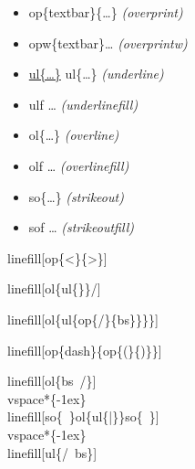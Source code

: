 \documentclass[english,12pt,openany,letterpaper]{book}
\begin{document}
\begin{itemize}
	\item {} \tab \bs op\{\bs textbar\}\{\ldots\} \tab \textit{(\bs overprint)}
	\item \opw{\textbar}\bs opw\{\bs textbar\}\ldots {} \textit{(\bs overprintw)}
	\item \ul{\bs ul\{\ldots\}} \tab\bs ul\{\ldots\} \tab \textit{(\bs underline)}
	\item \ulf \bs ulf \ldots {} \textit{(\bs underlinefill)}
	\item {} \tab\bs ol\{\ldots\} \tab \textit{(\bs overline)}
	\item \olf \bs olf \ldots {} \textit{(\bs overlinefill)}
	\item {} \tab\bs so\{\ldots\} \tab \textit{(\bs strikeout)}
	\item \sof \bs sof \ldots {} \textit{(\bs strikeoutfill)}
\end{itemize}

\skipline

\bs linefill[\bs op\{<\}\{>\}]

\linefill[\op{<}{>}]

\skipline

\bs linefill[\bs ol\{\bs ul\{\tld\}\}/]

\linefill[\ol{\ul{~}}/]

\skipline

\bs linefill[\bs ol\{\bs ul\{\bs op\{/\}\{\bs bs\}\}\}\}]

\linefill[{\ol{\ul{\op{/}{\bs}}}}]

\skipline

\bs linefill[\bs op\{\bs dash\}\{\bs op\{(\}\{)\}\}]

\linefill[\op{\dash}{\op{(}{)}}]

\skipline

\bs linefill[\bs ol\{\bs bs\bs\ /\}]\\
\bs vspace*\{-1ex\}\\
\bs linefill[\bs so\{\bs\ \}\bs ol\{\bs ul\{|\}\}\bs so\{\bs\ \}]\\
\bs vspace*\{-1ex\}\\
\bs linefill[\bs ul\{/\bs \ \bs bs\}]\\

\linefill[\ol{\bs\ /}]
\vspace*{-1ex}
\linefill[\so{\ }\ol{\ul{|}}\so{\ }]
\vspace*{-1ex}
\linefill[\ul{/\ \bs}]
\end{document}
